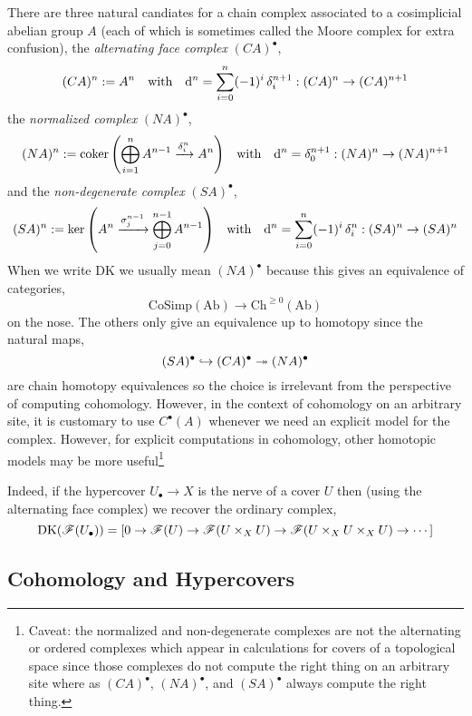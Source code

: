 \documentclass[12pt]{article}
\newcommand{\DK}{\mathrm{DK}}
\renewcommand{\Cech}{\text{\v{C}ech}\xspace}
\begin{document}
\begin{rmk}
There are three natural candiates for a chain complex associated to a cosimplicial abelian group $A$ (each of which is sometimes called the Moore complex for extra confusion), the \textit{alternating face complex} $(C A)^\bullet$,
\[ (C A)^n := A^n \quad \text{with} \quad \mathrm{d}^n = \sum_{i = 0}^n (-1)^i \, \delta^{n+1}_i : (C A)^n \to (C A)^{n+1} \]
the \textit{normalized complex} $(N A)^{\bullet}$,
\[ (N A)^n := \operatorname{\mathrm{coker}}{\left( \bigoplus_{i = 1}^{n} A^{n-1} \xrightarrow{\delta^n_i} A^n \right)} \quad \text{with} \quad \mathrm{d}^n = \delta^{n+1}_0 : (N A)^n \to (N A)^{n+1} \]
and the \textit{non-degenerate complex} $(S A)^{\bullet}$,
\[ (S A)^n := \ker{ \left( A^n \xrightarrow{\sigma^{n-1}_j} \bigoplus_{j = 0}^{n-1} A^{n-1} \right) } \quad \text{with} \quad \mathrm{d}^n = \sum_{i = 0}^n (-1)^i \, \delta^n_i : (S A)^n \to (S A)^n \]
When we write $\DK$ we usually mean $(N A)^\bullet$ because this gives an equivalence of categories,
\[ \mathrm{CoSimp}(\mathrm{Ab}) \to \mathrm{Ch}^{\ge 0}(\mathrm{Ab}) \]
on the nose. The others only give an equivalence up to homotopy since the natural maps,
\[ (S A)^\bullet \hookrightarrow (C A)^\bullet \twoheadrightarrow (N A)^\bullet \]
are chain homotopy equivalences so the choice is irrelevant from the perspective of computing cohomology.
However, in the context of \Cech cohomology on an arbitrary site, it is customary to use $C^\bullet(A)$ whenever we need an explicit model for the complex. However, for explicit computations in \Cech cohomology, other homotopic models may be more useful\footnote{Caveat: the normalized and non-degenerate complexes are not the alternating or ordered complexes which appear in \Cech calculations for covers of a topological space since those complexes do not compute the right thing on an arbitrary site where as $(C A)^\bullet$, $(N A)^\bullet$, and $(S A)^\bullet$ always compute the right thing.}
\end{rmk}

\begin{example}
Indeed, if the hypercover $U_\bullet \to X$ is the \Cech nerve of a cover $U$ then (using the alternating face complex) we recover the ordinary \Cech complex,
\[ \DK(\F(U_\bullet)) = \left[ 0 \to \F(U) \to \F(U \times_X U) \to \F(U \times_X U \times_X U) \to \cdots \right] \]
\end{example}

\subsection{Cohomology and Hypercovers}
\end{document}
